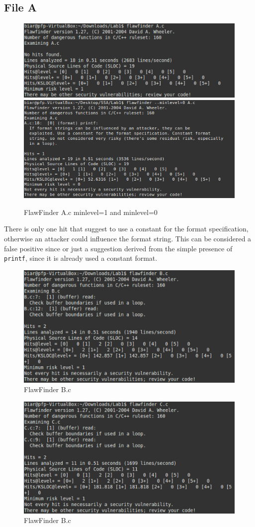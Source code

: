 \documentclass[a4paper]{article}
\begin{document}
\subsection*{File A}
\begin{figure}[h!]
    \centering
    \includegraphics[width=0.48\linewidth]{A-f}\quad\includegraphics[width=0.48\linewidth]{min-A}
    \caption{FlawFinder A.c minlevel=1 and minlevel=0}
\end{figure}

There is only one hit that suggest to use a constant for the format specification, otherwise an 
attacker could influence the format string. This can be considered a false positive since or
just a suggestion derived from the simple presence of \texttt{printf}, since it is already used 
a constant format.
\bigskip

\begin{figure}[h!]
    \centering
    \includegraphics[width=0.6\linewidth]{B-f}
    \caption{FlawFinder B.c}
\end{figure}

\begin{figure}[h!]
    \centering
    \includegraphics[width=0.6\linewidth]{C-f}
    \caption{FlawFinder B.c}
\end{figure}
\end{document}
